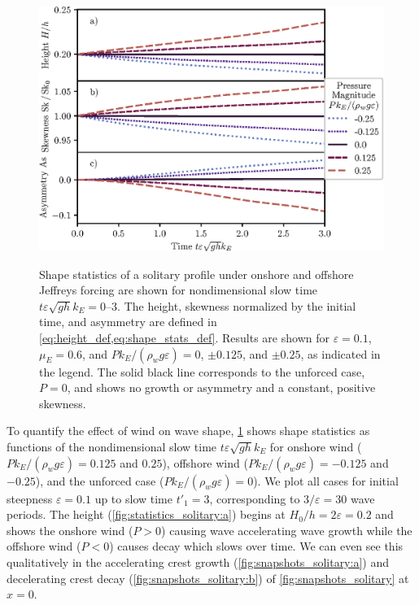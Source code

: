 \documentclass{jfm}
\renewcommand*{\epsilon}{\varepsilon}
\begin{document}
\begin{figure}
  \centering
  { %
    \label{fig:statistics_solitary:a}
    \label{fig:statistics_solitary:b}
    \label{fig:statistics_solitary:c}
  }
  \includegraphics{Skew-Asymm-Production.eps}
  \caption{
    Shape statistics of a solitary profile under onshore and offshore
    Jeffreys forcing are shown for nondimensional slow time $t \epsilon
    \sqrt{gh} k_E = \numrange{0}{3}$.
    The
    height,
    skewness normalized by the initial time, and
    asymmetry are defined in
    \cref{eq:height_def,eq:shape_stats_def}.
    Results are shown for $\epsilon=0.1$, $\mu_E = 0.6$, and $P
    k_E/(\rho_w g \epsilon) = 0$, $\pm 0.125$, and $\pm 0.25$, as
    indicated in the legend.
    The solid black line corresponds to the unforced case, $P = 0$, and
    shows no growth or asymmetry and a constant, positive skewness.
  }\label{fig:statistics_solitary}
\end{figure}

To quantify the effect of wind on wave shape,
\cref{fig:statistics_solitary} shows shape statistics as functions of
the nondimensional slow time $t \epsilon \sqrt{g h} k_E$ for onshore
wind ($P k_E/(\rho_w g \epsilon) = 0.125$ and $0.25$), offshore wind ($P
k_E/(\rho_w g \epsilon) = -0.125$ and $-0.25$), and the unforced case
($P k_E/(\rho_w g \epsilon) = 0$).
We plot all cases for initial steepness $\epsilon = 0.1$ up to slow
time $t'_1 = 3$, corresponding to $3/\epsilon = 30$ wave periods.
The height (\cref{fig:statistics_solitary:a}) begins at $H_0/h = 2
\epsilon = 0.2$ and shows the onshore wind ($P>0$) causing wave
accelerating wave growth while the offshore wind ($P<0$) causes decay
which slows over time.
We can even see this qualitatively in the accelerating crest growth
(\cref{fig:snapshots_solitary:a}) and decelerating crest decay
(\cref{fig:snapshots_solitary:b}) of \cref{fig:snapshots_solitary} at
$x=0$.
\end{document}

